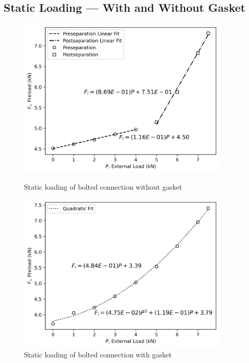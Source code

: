 \subsection{Static Loading --- With and Without Gasket}
\label{sec:static_loading_with_without_gasket}
\begin{figure}[h]
    \centering
    \begin{minipage}{0.50\textwidth}
        \centering
        \includegraphics[width=0.9\textwidth]{Sections/Figures/without_gasket_preseperation_vs_postseperation.png}
        \caption{Static loading of bolted connection without gasket}
        \label{fig:without_gasket_loading}
    \end{minipage}\hfill
    \begin{minipage}{0.50\textwidth}
        \centering
        \includegraphics[width=0.9\textwidth]{Sections/Figures/with_gasket_preseperation.png}
        \caption{Static loading of bolted connection with gasket}
        \label{fig:with_gasket_loading}
    \end{minipage}
\end{figure}
